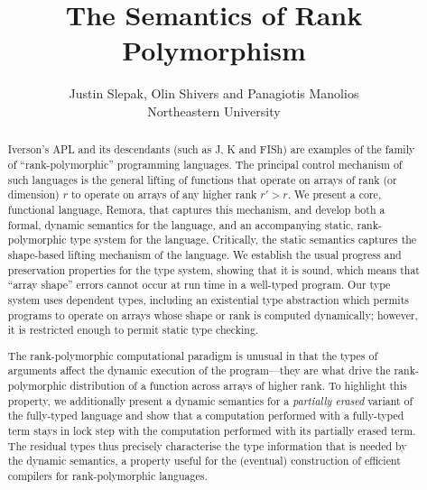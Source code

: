 \documentclass{jfp1}
\begin{document}
\title[The Semantic Foundations of Rank Polymorphism]
{The Semantics of Rank Polymorphism}
\author[Justin Slepak, Olin Shivers and Panagiotis Manolios]
{Justin Slepak, Olin Shivers and Panagiotis Manolios \\ Northeastern University}


\maketitle

\begin{abstract}
Iverson's APL and its descendants (such as J, K and FISh)
are examples of the family of ``rank-polymorphic'' programming languages.
The principal control mechanism of such languages is the
general lifting of functions that operate on arrays of rank (or dimension)
$r$ to operate on arrays of any higher rank $r' > r$.
We present a core, functional language, Remora,
that captures this mechanism,
and develop both a formal, dynamic semantics for the language,
and an accompanying static, rank-polymorphic type system for the language.
Critically, the static semantics captures
the shape-based lifting mechanism of the language.
We establish the usual progress and preservation properties for
the type system, showing that it is sound,
which means that ``array shape'' errors cannot occur at run time
in a well-typed program.
Our type system uses dependent types,
including an existential type abstraction
which permits programs to operate on arrays whose shape or rank is
computed dynamically;
however, it is restricted enough to permit static type checking.

The rank-polymorphic computational paradigm is unusual in that the
types of arguments affect the dynamic execution of the program---they
are what drive the rank-polymorphic distribution of a function across
arrays of higher rank.
To highlight this property,
we additionally present a dynamic semantics for a \emph{partially erased}
variant of the fully-typed language
and show that a computation performed with a fully-typed term stays
in lock step with the computation performed with its partially erased term.
The residual types thus precisely characterise the type information that
is needed by the dynamic semantics,
a property useful for the (eventual) construction of efficient compilers for
rank-polymorphic languages.

\end{abstract}


%





\end{document}
